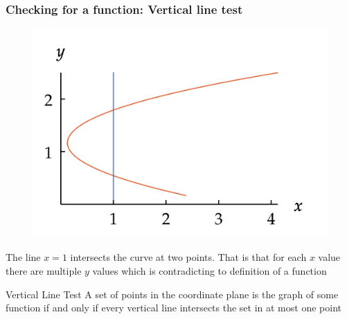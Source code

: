 \documentclass{beamer}
\begin{document}
\begin{frame}
  \frametitle{Checking for a function: Vertical line test}
  \begin{figure}[h]    
  \centering
  \includegraphics[scale=0.5]{not-fn.png}
  \end{figure}
  \pause
  The line  \(x=1\) intersects the curve at two points. That is that for each \(x\) value there are multiple \(y\) values which is contradicting to definition of a function 
  \begin{block}{Vertical Line Test}
    A set of points in the coordinate plane is the graph of some function if and only if every vertical line intersects the set in at most one point 
  \end{block}
\end{frame} 
\end{document}
